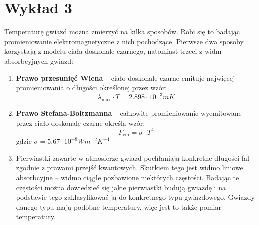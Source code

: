 \documentclass[../index.tex]{subfiles}
\begin{document}
    \section{Wykład 3}
        Temperaturę gwiazd można zmierzyć na kilka sposobów. Robi się to badając promieniowanie elektromagnetyczne z nich pochodzące. Pierwsze dwa sposoby korzystają z modelu ciała doskonale czarnego, natomiast trzeci z widm absorbcyjnych gwiazd:
        \begin{enumerate}
            \item \textbf{Prawo przesunięć Wiena} \--- ciało doskonale czarne  emituje najwięcej promieniowania o długości określonej przez wzór:
            \begin{equation} 
                \lambda_{\max} \cdot T = 2.898 \cdot 10^{ - 3}mK
            \end{equation} 
            \item \textbf{Prawo Stefana-Boltzmanna} \--- całkowite promieniowanie wyemitowane przez ciało doskonale czarne określa wzór:
            \begin{equation}
                F_\text{em}=\sigma \cdot T^{4}\label{eq:Stefan-Boltzmann}
            \end{equation}
            gdzie \(\sigma = 5.67 \cdot 10^{ - 8}Wm^{ - 2}K^{ - 4}\)
            \item Pierwiastki zawarte w atmosferze gwiazd pochłaniają konkretne długości fal zgodnie z prawami przejść kwantowych. Skutkiem tego jest widmo liniowe absorbcyjne \--- widmo ciągłe pozbawione niektórych częstości. Badając te częstości można dowiedzieć się jakie pierwiastki budują gwiazdę i na podstawie tego zaklasyfikować ją do konkretnego typu gwiazdowego. Gwiazdy danego typu mają podobne temperatury, więc jest to także pomiar temperatury.
        \end{enumerate}
\end{document}
